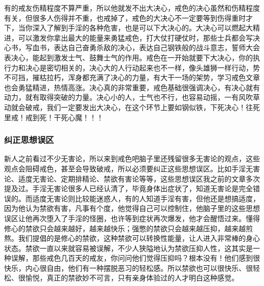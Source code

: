 有的戒友伤精程度不算严重，所以他就发不出大决心，戒色的决心虽然和伤精程度有关，但很多人伤得并不重，也戒掉了，戒色的大决心不一定要等到伤得重时才下，当你深入了解到手淫的各种危害，也是可以下大决心的。大决心可以燃起大精进，可以激发你拿出最大的能量来勇猛戒色，打大仗打硬仗时，那些士兵都会写决心书，写血书，表达自己奋勇杀敌的决心，表达自己钢铁般的战斗意志，誓师大会表决心，能起到激发士气、鼓舞士气的作用。戒色在一开始就要下大决心，你的执行力和决心是密切相关的，决心大的人行动起来也不一样，像头雄狮一样行动，势不可挡，摧枯拉朽，浑身都充满了决心的力量，有大干一场的架势，学习戒色文章也会勇猛精进，热情高涨。决心真的非常重要，戒色基础很强调决心，有决心就有动力，就有取得突破的力量。决心小的人，士气也不行，也容易动摇，一有风吹草动就会破戒，我们一定要发出大决心，在这个环节上要如钢似铁，下死决心！往死里戒！戒到死！干死心魔！！！

\subsubsection{纠正思想误区}

新人之前看过不少无害论，所以来到戒色吧脑子里还残留很多无害论的观点，这些观点会阻碍戒色，甚至会导致破戒，所以必须要纠正这些思想误区。比如手淫无害论、适度无害论、定期排精论、禁欲有害论等等，这些思想误区我之前的文章多次提及过。手淫无害论很多人已经认清了，毕竟身体出症状了，知道无害论是完全错误的。而适度无害论则比较能迷惑人，有的人知道手淫有害，但他还是想搞适度，因为他认为禁欲有害，凡事有个度，他觉得自己可以控制住，他脑子里的这些思想误区让他再次堕入了手淫的怪圈，也许等到症状再次爆发，他才会醒悟过来。懂得修心的禁欲只会越来越好，越来越快乐；强憋的禁欲只会越来越压抑，越来越煎熬。我们提倡的是修心的禁欲，这种禁欲可以转换性能量，让人进入非常棒的身心状态。禁欲一直以来就容易被误解，不少人狭隘地认为禁欲压抑人性，这其实是一种误解，那些戒色几百天的戒友，你问问他们觉得压抑吗？根本没有！他们感到很快乐，内心很自由，他们有一种摆脱恶习的轻松感。所以禁欲也可以很快乐、很轻松、很愉悦，真正的禁欲妙不可言，只有亲身体验过的人才明白这种感觉。

